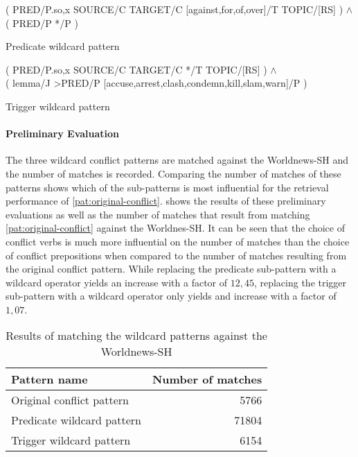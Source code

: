 \documentclass[11pt]{scrreprt}
\begin{document}
\begin{pattern}
  \normalfont\sffamily
  \centering
  ( PRED/P.{so,x} SOURCE/C TARGET/C [against,for,of,over]/T TOPIC/[RS] ) \(\wedge\) \\ ( PRED/P */P )
  \caption{Predicate wildcard pattern}
  \label{pat:wildcard-pred}
\end{pattern}

\begin{pattern}
  \normalfont\sffamily
  \centering
  ( PRED/P.{so,x} SOURCE/C TARGET/C */T TOPIC/[RS] ) \(\wedge\) \\  ( lemma/J >PRED/P [accuse,arrest,clash,condemn,kill,slam,warn]/P )
  \caption{Trigger wildcard pattern}
  \label{pat:wildcard-prep}
\end{pattern}


\paragraph{Preliminary Evaluation}
The three wildcard conflict patterns are matched against the Worldnews-SH and the number of matches is recorded. Comparing the number of matches of these patterns shows which of the sub-patterns is most influential for the retrieval performance of \cref{pat:original-conflict}.  shows the results of these preliminary evaluations as well as the number of matches that result from matching \cref{pat:original-conflict} against the Worldnes-SH. It can be seen that the choice of conflict verbs is much more influential on the number of matches than the choice of conflict prepositions when compared to the number of matches resulting from the original conflict pattern. While replacing the predicate sub-pattern with a wildcard operator yields an increase with a factor of \(12,45\), replacing the trigger sub-pattern with a wildcard operator only yields and increase with a factor of \(1,07\). 


\begin{table}[h]
\centering
\begin{tabular}{lr}
\toprule
\multicolumn{1}{l}{Pattern name}				& \multicolumn{1}{l}{Number of matches} \\
\midrule
Original conflict pattern					& 5766	\\
Predicate wildcard pattern					& 71804 \\
Trigger wildcard pattern						& 6154	\\
\bottomrule
\end{tabular}
\caption{Results of matching the wildcard patterns against the Worldnews-SH}
\label{tab:wildcard-pattern-evaluation}
\end{table}
\end{document}
